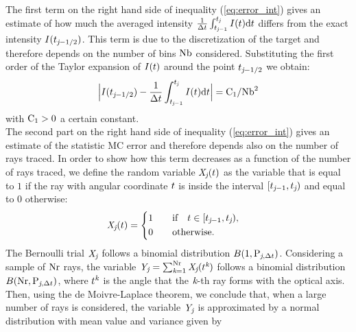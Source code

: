 \indent The first term on the right hand side of inequality (\ref{eq:error_int}) gives an estimate of how much the averaged intensity
 $\frac{1}{\Delta t}\int_{t_{\textit{j}-1}}^{t_{\textit{j}}} I(t)\textrm{d}t$ differs from the exact intensity $I(t_{\textit{j}-1/2})$.
This term is due to the discretization of the target and therefore depends on the number of bins $\textrm{Nb}$ considered. Substituting the first order of the Taylor expansion of $I(t)$ around the point $t_{\textit{j}-1/2}$ we obtain:
\begin{equation}\Big|I(t_{\textit{j}-1/2})-\frac{1}{\Delta t}\int_{t_{\textit{j}-1}}^{t_{\textit{j}}} I(t)\textrm{d}t\Big| = \textrm{C}_1/\textrm{Nb}^2\end{equation}
with $\textrm{C}_1>0$ a certain constant. \\
\indent
The second part on the right hand side of inequality (\ref{eq:error_int}) gives an estimate of the statistic MC error and therefore depends also on the
number of rays traced.
In order to show how this term decreases as a function of the number of rays traced,
we define the random variable $\textit{X}_{\textit{j}}(t)$ as the variable that is equal to $1$ if the ray with angular coordinate $t$
is inside the interval $[t_{\textit{j}-1}, t_{\textit{j}})$ and equal to $0$ otherwise:
\begin{equation}
\label{radom_variable}
\textit{X}_{\textit{j}}(t) = \begin{cases} \begin{aligned}
1& \qquad \mbox{if} \quad t\in [t_{\textit{j}-1}, t_{\textit{j}}),\\
0 & \qquad \mbox{otherwise}.
\end{aligned}\end{cases}
\end{equation}
The Bernoulli trial $ \textit{X}_{\textit{j}}$ follows a binomial distribution $B(1,\textrm{P}_{\textit{j}, \Delta t})$.
Considering a sample of $\textrm{Nr}$ rays, the variable $\textit{Y}_{\textit{j}} = \sum_{\textit{k}=1}^{\textrm{Nr}} \textit{X}_{\textit{j}}(t^{\textit{k}})$
follows a binomial distribution $B(\textrm{Nr}, \textrm{P}_{\textit{j},\Delta t})$, where $t^{\textit{k}}$ is the angle that the $\textit{k}$-th ray forms
 with the optical axis. Then, using the de Moivre-Laplace theorem, we conclude that, when a large number of rays is considered, the variable $\textit{Y}_{\textit{j}}$ is approximated by a normal distribution with mean value and variance given by 
